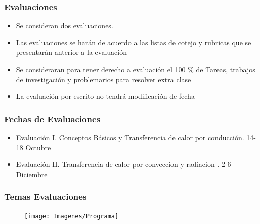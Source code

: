 \documentclass{beamer}
\begin{document}
\begin{frame}
\frametitle{Evaluaciones}
\begin{itemize} 
	\item Se consideran dos evaluaciones.
	\item Las evaluaciones se harán de acuerdo a las listas de cotejo y rubricas que se presentarán anterior a la evaluación
	\item Se consideraran para tener derecho a evaluación el 100 \% de Tareas, trabajos de investigación y problemarios para resolver extra clase
	\item La evaluación por escrito no tendrá modificación de fecha 
\end{itemize}
	
\end{frame}
\begin{frame}
\frametitle{Fechas de Evaluaciones}
\begin{itemize} 
	\item Evaluación I. Conceptos Básicos y Transferencia de calor por conducción. 14-18 Octubre
	\item Evaluación II. Transferencia de calor por conveccion y radiacion  . 2-6 Diciembre
  \end{itemize}
	
\end{frame}

\begin{frame}
	\frametitle{Temas Evaluaciones}
	\begin{figure}
		\centering
		\texttt{[image: Imagenes/Programa]}
		\label{fig:Eval1} 
	\end{figure}
\end{frame}
\end{document}
